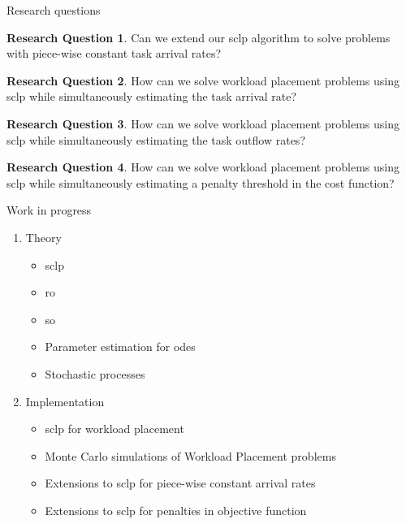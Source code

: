\documentclass[pdf]{beamer}
\theoremstyle{definition}
\newtheorem{question}{Research Question}
\begin{document}
\begin{frame}{Research questions}

    \begin{question}
        Can we extend our \gls{sclp} algorithm to solve problems with piece-wise constant task arrival rates?
    \end{question}

    \begin{question}
        How can we solve workload placement problems using \gls{sclp} while simultaneously estimating the task arrival rate?
    \end{question}

    \begin{question}
        How can we solve workload placement problems using \gls{sclp} while simultaneously estimating the task outflow rates?
    \end{question}

    \begin{question}
        How can we solve workload placement problems using \gls{sclp} while simultaneously estimating a penalty threshold in the cost function?
    \end{question}

\end{frame}


\begin{frame}{Work in progress}

    \begin{enumerate}
        \item Theory

        \begin{itemize}
            \item \Gls{sclp}
            \item \Gls{ro}
            \item \Gls{so}
            \item Parameter estimation for \Glspl{ode}
            \item Stochastic processes
        \end{itemize}

        \item Implementation
        \begin{itemize}
            \item \Gls{sclp} for workload placement
            \item Monte Carlo simulations of Workload Placement problems
            \item Extensions to \gls{sclp} for piece-wise constant arrival rates
            \item Extensions to \gls{sclp} for penalties in objective function
        \end{itemize}

    \end{enumerate}

\end{frame}
\end{document}
